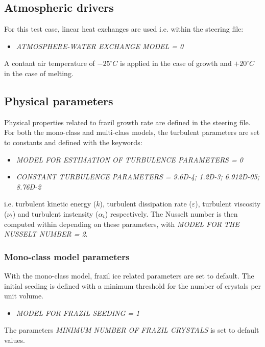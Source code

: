 \subsection{Atmospheric drivers}

For this test case, linear heat exchanges are used i.e. within the \khione steering file:
\begin{itemize}
	\item\textit{ATMOSPHERE-WATER EXCHANGE MODEL = 0}
\end{itemize}
A contant air temperature of $-25^\circ C$ is applied in the case of growth and $+20^\circ C$ in the case of melting.

\subsection{Physical parameters}

Physical properties related to frazil growth rate are defined in the \khione steering file. 
For both the mono-class and multi-class models, the turbulent parameters are set to constants
and defined with the keywords:
\begin{itemize}
	\item\textit{MODEL FOR ESTIMATION OF TURBULENCE PARAMETERS = 0}
	\item\textit{CONSTANT TURBULENCE PARAMETERS = 9.6D-4; 1.2D-3; 6.912D-05; 8.76D-2}
\end{itemize}
i.e. turbulent kinetic energy ($k$),
turbulent dissipation rate ($\varepsilon$), turbulent viscosity ($\nu_t$) and 
turbulent instensity ($\alpha_t$) respectively.
The Nusselt number is then computed within \khione depending on these parameters, 
with \textit{MODEL FOR THE NUSSELT NUMBER = 2}.

\subsubsection{Mono-class model parameters}
With the mono-class model, frazil ice related parameters are set to default.
The initial seeding is defined with a minimum threshold for the number of crystals per unit volume.
\begin{itemize}
  \item\textit{MODEL FOR FRAZIL SEEDING = 1}
\end{itemize}
The parameters \textit{MINIMUM NUMBER OF FRAZIL CRYSTALS} is set to default values.

